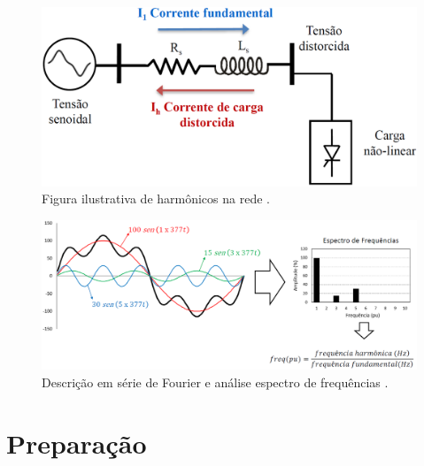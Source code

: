 \documentclass[a4paper,12pt,oneside,openany,table,xcdraw]{article}
\begin{document}
\vspace{0.5cm}
\begin{figure}[H]
\hspace{0.4cm}
\centering
\includegraphics[width=12.5cm]{harmonicos}
\caption{Figura ilustrativa de harmônicos na rede \cite{PH}.}
\label{intro:fig1}
\end{figure}

\vspace{0.5cm}
\begin{figure}[H]
\hspace{0.4cm}
\centering
\includegraphics[width=12.5cm]{espectro}
\caption{Descrição em série de Fourier  e análise espectro de frequências \cite{PH}.}
\label{intro:fig2}
\end{figure}
\vspace{0.3cm}

\section{Preparação}
\end{document}
